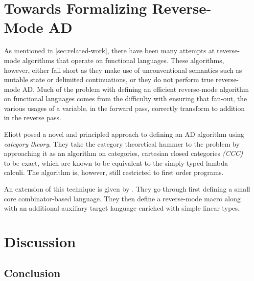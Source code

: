 \documentclass[11pt, final]{article}
\begin{document}
\section{Towards Formalizing Reverse-Mode AD}\label{sec:rev}
  As mentioned in \cref{sec:related-work}, there have been many attempts at reverse-mode algorithms that operate on functional languages.
  These algorithms, however, either fall short as they make use of unconventional semantics such as mutable state or delimited continuations, or they do not perform true reverse-mode AD.
  Much of the problem with defining an efficient reverse-mode algorithm on functional languages comes from the difficulty with ensuring that fan-out, the various usages of a variable, in the forward pass, correctly transform to addition in the reverse pass.

  Eliott posed a novel and principled approach to defining an AD algorithm using \textit{category theory}\cite{Elliott-2018-ad-icfp}.
  They take the category theoretical hammer to the problem by approaching it as an algorithm on categories, cartesian closed categories \textit{(CCC)} to be exact, which are known to be equivalent to the simply-typed lambda calculi\cite{Elliott-2017-compiling-to-categories}\cite{10.1007/3-540-15198-2_10}.
  The algorithm is, however, still restricted to first order programs.

  An extension of this technique is given by \Vakar{}\cite{vkr2020reverse}.
  They go through first defining a small core combinator-based language.
  They then define a reverse-mode macro along with an additional auxiliary target language enriched with simple linear types.
  
  
  
\section{Discussion}
  
  \subsection{Conclusion}
\appendix
\clearpage
\printbibliography
\makeatother
\end{document}
